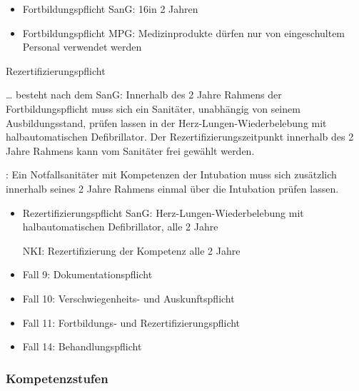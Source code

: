 {\begin{itemize}
  \item Fortbildungspflicht SanG: 16\Hour* in 2 Jahren
  \item Fortbildungspflicht MPG: Medizinprodukte dürfen nur
  von eingeschultem Personal verwendet werden
\end{itemize}
}
{}
{}
{}

\TextSlide
{Rezertifizierungspflicht}
{\label{topic:rezertifizierungspflicht}%
{\ldots} besteht nach dem SanG: 
Innerhalb des 2 Jahre Rahmens der Fortbildungspflicht muss
sich ein Sanitäter, unabhängig von seinem Ausbildungsstand,
prüfen lassen in der Herz-Lungen-Wiederbelebung mit
halbautomatischen Defibrillator.
Der Rezertifizierungszeitpunkt innerhalb des 2 Jahre Rahmens
kann vom Sanitäter frei gewählt werden.

\noindent{}: Ein Notfallsanitäter mit
Kompetenzen der Intubation muss sich zusätzlich innerhalb seines 2
Jahre Rahmens einmal über die Intubation prüfen lassen.
}
{
\begin{itemize}
  \item Rezertifizierungspflicht SanG:
  Herz-Lungen-Wiederbelebung mit halbautomatischen
  Defibrillator, alle 2 Jahre
  
  NKI: Rezertifizierung der Kompetenz alle 2 Jahre
\end{itemize}
}
{}
{}
{}


{
\begin{itemize}
  \item Fall 9: Dokumentationspflicht
  \dotfill{}
  \item Fall 10: Verschwiegenheits- und Auskunftspflicht
  \dotfill{}
  \item Fall 11: Fortbildungs- und Rezertifizierungspflicht
  \dotfill{}
  \item Fall 14: Behandlungspflicht
  \dotfill{}
\end{itemize}
}
{}
{}
{}
{}





\subsubsection{Kompetenzstufen}

